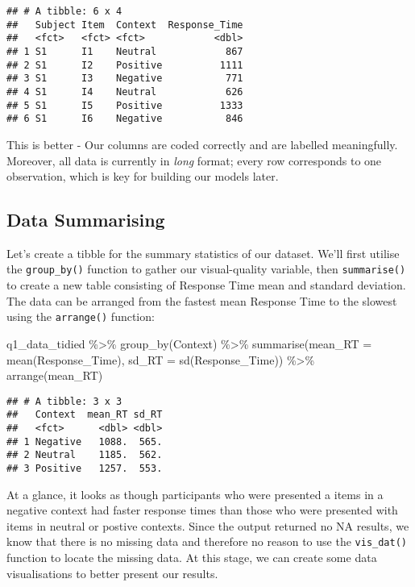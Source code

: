 \documentclass[
]{article}
\newenvironment{Shaded}{\begin{snugshade}}{\end{snugshade}}
\newcommand{\AttributeTok}[1]{\textcolor[rgb]{0.77,0.63,0.00}{#1}}
\newcommand{\FunctionTok}[1]{\textcolor[rgb]{0.00,0.00,0.00}{#1}}
\newcommand{\NormalTok}[1]{#1}
\newcommand{\SpecialCharTok}[1]{\textcolor[rgb]{0.00,0.00,0.00}{#1}}
\begin{document}
\begin{verbatim}
## # A tibble: 6 x 4
##   Subject Item  Context  Response_Time
##   <fct>   <fct> <fct>            <dbl>
## 1 S1      I1    Neutral            867
## 2 S1      I2    Positive          1111
## 3 S1      I3    Negative           771
## 4 S1      I4    Neutral            626
## 5 S1      I5    Positive          1333
## 6 S1      I6    Negative           846
\end{verbatim}

This is better - Our columns are coded correctly and are labelled
meaningfully. Moreover, all data is currently in \emph{long} format;
every row corresponds to one observation, which is key for building our
models later.

\hypertarget{data-summarising}{%
\subsection{Data Summarising}\label{data-summarising}}

Let's create a tibble for the summary statistics of our dataset. We'll
first utilise the \texttt{group\_by()} function to gather our
visual-quality variable, then \texttt{summarise()} to create a new table
consisting of Response Time mean and standard deviation. The data can be
arranged from the fastest mean Response Time to the slowest using the
\texttt{arrange()} function:

\begin{Shaded}
\begin{Highlighting}[]
\NormalTok{q1\_data\_tidied }\SpecialCharTok{\%\textgreater{}\%} 
  \FunctionTok{group\_by}\NormalTok{(Context) }\SpecialCharTok{\%\textgreater{}\%} 
  \FunctionTok{summarise}\NormalTok{(}\AttributeTok{mean\_RT =} \FunctionTok{mean}\NormalTok{(Response\_Time), }\AttributeTok{sd\_RT =} \FunctionTok{sd}\NormalTok{(Response\_Time)) }\SpecialCharTok{\%\textgreater{}\%}
  \FunctionTok{arrange}\NormalTok{(mean\_RT)}
\end{Highlighting}
\end{Shaded}

\begin{verbatim}
## # A tibble: 3 x 3
##   Context  mean_RT sd_RT
##   <fct>      <dbl> <dbl>
## 1 Negative   1088.  565.
## 2 Neutral    1185.  562.
## 3 Positive   1257.  553.
\end{verbatim}

At a glance, it looks as though participants who were presented a items
in a negative context had faster response times than those who were
presented with items in neutral or postive contexts. Since the output
returned no NA results, we know that there is no missing data and
therefore no reason to use the \texttt{vis\_dat()} function to locate
the missing data. At this stage, we can create some data visualisations
to better present our results.
\end{document}

